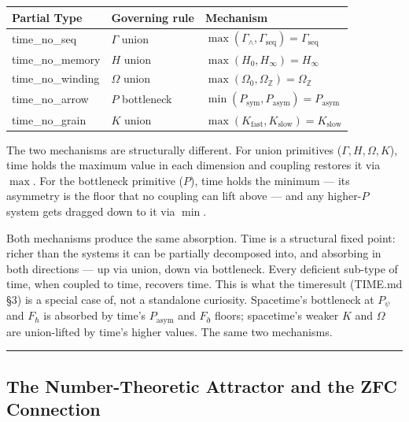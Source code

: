 \documentclass[12pt,a4paper]{article}
\newcommand{\pilcrow}{\S}
\begin{document}
\begin{table}[htbp]
\centering
\small
{}
\begin{tabularx}{\textwidth}{>{\centering\arraybackslash}X >{\centering\arraybackslash}X >{\centering\arraybackslash}X}
\toprule
\rowcolor{gray!25}\textbf{Partial Type} & \textbf{Governing rule} & \textbf{Mechanism} \\
\midrule
\rowcolors{1}{white}{gray!10}
time\_no\_seq & $\Gamma$ union & $\max(\Gamma_{\wedge}, \Gamma_\text{seq}) = \Gamma_\text{seq}$ \\
time\_no\_memory & $H$ union & $\max(H_0, H_{\infty}) = H_{\infty}$ \\
time\_no\_winding & $\Omega$ union & $\max(\Omega_0, \Omega_\mathbb{Z}) = \Omega_\mathbb{Z}$ \\
time\_no\_arrow & $P$ bottleneck & $\min(P_\text{sym}, P_\text{asym}) = P_\text{asym}$ \\
time\_no\_grain & $K$ union & $\max(K_\text{fast}, K_\text{slow}) = K_\text{slow}$ \\
\bottomrule
\end{tabularx}
\end{table}

The two mechanisms are structurally different. For union primitives ($\Gamma, H, \Omega, K$), time holds the maximum value in each dimension and coupling restores it via $\max$. For the bottleneck primitive ($P$), time holds the minimum --- its asymmetry is the floor that no coupling can lift above --- and any higher-$P$ system gets dragged down to it via $\min$.

Both mechanisms produce the same absorption. Time is a structural fixed point: richer than the systems it can be partially decomposed into, and absorbing in both directions --- up via union, down via bottleneck. Every deficient sub-type of time, when coupled to time, recovers time. This is what the time\otimesspacetime result (TIME.md \pilcrow{}3) is a special case of, not a standalone curiosity. Spacetime's bottleneck at $P_{\psi}$ and $F_{\hbar}$ is absorbed by time's $P_\text{asym}$ and $F_{\eth}$ floors; spacetime's weaker $K$ and $\Omega$ are union-lifted by time's higher values. The same two mechanisms.

\begin{center}
\rule{0.5\textwidth}{0.4pt}
\end{center}

\subsection{The Number-Theoretic Attractor and the ZFC Connection}
\end{document}
